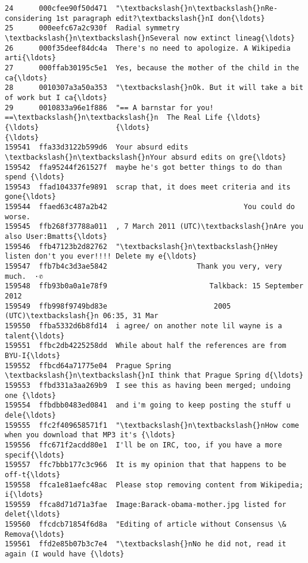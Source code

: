 \documentclass[11pt]{article}
\begin{document}
\begin{Verbatim}[commandchars=\\\{\}]
24      000cfee90f50d471  "\textbackslash{}n\textbackslash{}nRe-considering 1st paragraph edit?\textbackslash{}nI don{\ldots}   
25      000eefc67a2c930f  Radial symmetry \textbackslash{}n\textbackslash{}nSeveral now extinct lineag{\ldots}   
26      000f35deef84dc4a  There's no need to apologize. A Wikipedia arti{\ldots}   
27      000ffab30195c5e1  Yes, because the mother of the child in the ca{\ldots}   
28      0010307a3a50a353  "\textbackslash{}nOk. But it will take a bit of work but I ca{\ldots}   
29      0010833a96e1f886  "== A barnstar for you! ==\textbackslash{}n\textbackslash{}n  The Real Life {\ldots}   
{\ldots}                  {\ldots}                                                {\ldots}   
159541  ffa33d3122b599d6  Your absurd edits \textbackslash{}n\textbackslash{}nYour absurd edits on gre{\ldots}   
159542  ffa95244f261527f  maybe he's got better things to do than spend {\ldots}   
159543  ffad104337fe9891  scrap that, it does meet criteria and its gone{\ldots}   
159544  ffaed63c487a2b42                                You could do worse.   
159545  ffb268f37788a011  , 7 March 2011 (UTC)\textbackslash{}nAre you also User:Bmatts{\ldots}   
159546  ffb47123b2d82762  "\textbackslash{}n\textbackslash{}nHey listen don't you ever!!!! Delete my e{\ldots}   
159547  ffb7b4c3d3ae5842                     Thank you very, very much.  ·✆   
159548  ffb93b0a0a1e78f9                        Talkback: 15 September 2012   
159549  ffb998f9749bd83e                         2005 (UTC)\textbackslash{}n 06:35, 31 Mar   
159550  ffba5332d6b8fd14  i agree/ on another note lil wayne is a talent{\ldots}   
159551  ffbc2db4225258dd  While about half the references are from BYU-I{\ldots}   
159552  ffbcd64a71775e04  Prague Spring \textbackslash{}n\textbackslash{}nI think that Prague Spring d{\ldots}   
159553  ffbd331a3aa269b9  I see this as having been merged; undoing one {\ldots}   
159554  ffbdbb0483ed0841  and i'm going to keep posting the stuff u dele{\ldots}   
159555  ffc2f409658571f1  "\textbackslash{}n\textbackslash{}nHow come when you download that MP3 it's {\ldots}   
159556  ffc671f2acdd80e1  I'll be on IRC, too, if you have a more specif{\ldots}   
159557  ffc7bbb177c3c966  It is my opinion that that happens to be off-t{\ldots}   
159558  ffca1e81aefc48ac  Please stop removing content from Wikipedia; i{\ldots}   
159559  ffca8d71d71a3fae  Image:Barack-obama-mother.jpg listed for delet{\ldots}   
159560  ffcdcb71854f6d8a  "Editing of article without Consensus \& Remova{\ldots}   
159561  ffd2e85b07b3c7e4  "\textbackslash{}nNo he did not, read it again (I would have {\ldots}   

\end{Verbatim}
\end{document}
